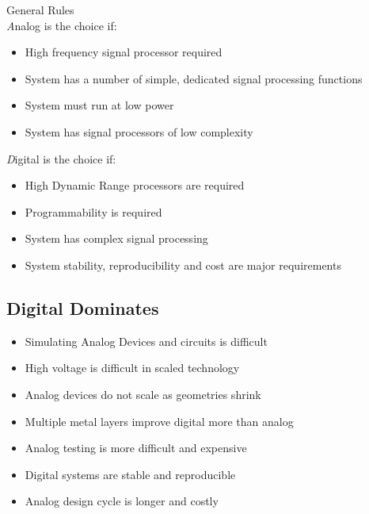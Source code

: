 \documentclass[11pt,fleqn]{book} %
\begin{document}
\begin{description}
 \item General Rules \\
  \emph Analog is the choice if:
  \begin{itemize}
   \item High frequency signal processor required
   \item System has a number of simple, dedicated signal processing functions
   \item System must run at low power
   \item System has signal processors of low complexity
  \end{itemize}
  \emph Digital is the choice if:
  \begin{itemize}
   \item High Dynamic Range processors are required
   \item Programmability is required
   \item System has complex signal processing
   \item System stability, reproducibility and cost are major requirements
  \end{itemize}
 \end{description}


\subsection{Digital Dominates}

\begin{itemize}
 \item Simulating Analog Devices and circuits is difficult
 \item High voltage is difficult in scaled technology
 \item Analog devices do not scale as geometries shrink
 \item Multiple metal layers improve digital more than analog
 \item Analog testing is more difficult and expensive
 \item Digital systems are stable and reproducible
 \item Analog design cycle is longer and costly
\end{itemize}
\end{document}
